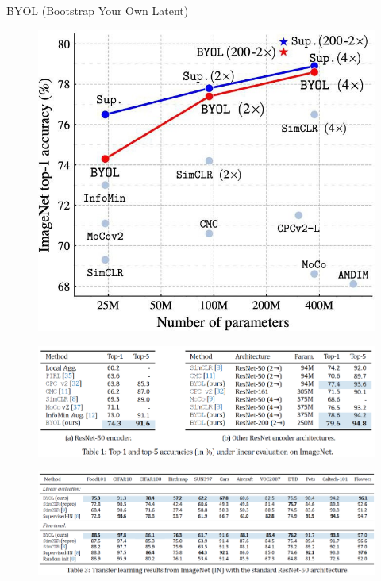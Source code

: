 \begin{frame}[allowframebreaks]{BYOL (Bootstrap Your Own Latent)}
\begin{figure}
    \centering
    \includegraphics[width=\linewidth,height=0.9\textheight,keepaspectratio]{images/contrastive/slide_83_1_img.jpg}
\end{figure}

\framebreak

\begin{figure}
    \centering
    \includegraphics[width=\linewidth,height=0.9\textheight,keepaspectratio]{images/contrastive/slide_84_1_img.png}
\end{figure}

\framebreak

\begin{figure}
    \centering
    \includegraphics[width=\linewidth,height=0.9\textheight,keepaspectratio]{images/contrastive/slide_85_1_img.png}
\end{figure}


\end{frame}
